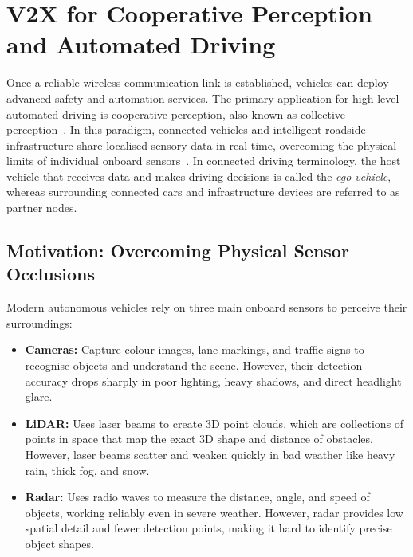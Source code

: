 \section{V2X for Cooperative Perception and Automated Driving}
\label{sec:cooperative_perception}

Once a reliable wireless communication link is established, vehicles can deploy advanced safety and automation services.
The primary application for high-level automated driving is cooperative perception, also known as collective perception~\cite{zhang2026cooperative}.
In this paradigm, connected vehicles and intelligent roadside infrastructure share localised sensory data in real time, overcoming the physical limits of individual onboard sensors~\cite{huang2025v2x}.
In connected driving terminology, the host vehicle that receives data and makes driving decisions is called the \textit{ego vehicle}, whereas surrounding connected cars and infrastructure devices are referred to as partner nodes.

\subsection{Motivation: Overcoming Physical Sensor Occlusions}
Modern autonomous vehicles rely on three main onboard sensors to perceive their surroundings:
\begin{itemize}
    \item \textbf{Cameras:} Capture colour images, lane markings, and traffic signs to recognise objects and understand the scene.
    However, their detection accuracy drops sharply in poor lighting, heavy shadows, and direct headlight glare.
    \item \textbf{LiDAR:} Uses laser beams to create 3D point clouds, which are collections of points in space that map the exact 3D shape and distance of obstacles.
    However, laser beams scatter and weaken quickly in bad weather like heavy rain, thick fog, and snow.
    \item \textbf{Radar:} Uses radio waves to measure the distance, angle, and speed of objects, working reliably even in severe weather.
    However, radar provides low spatial detail and fewer detection points, making it hard to identify precise object shapes.
\end{itemize}

